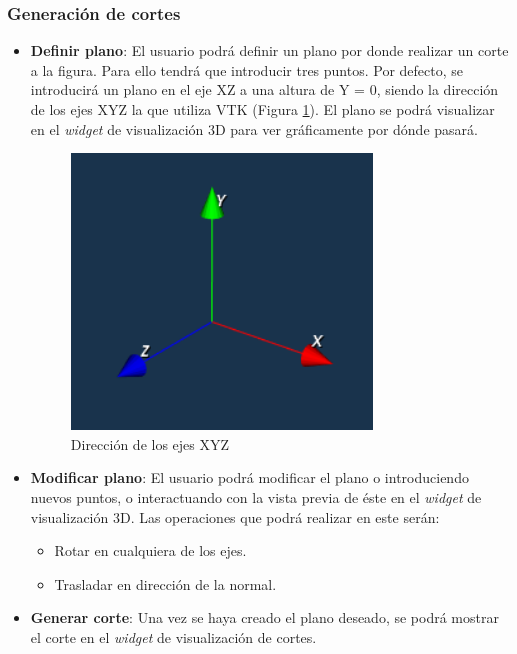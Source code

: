 		\subsubsection{Generación de cortes}
		\begin{itemize}
			\item \textbf{Definir plano}: El usuario podrá definir un plano por donde realizar un corte a la figura. Para ello tendrá que introducir tres puntos. Por defecto, se introducirá un plano en el eje XZ a una altura de Y = 0, siendo la dirección de los ejes XYZ la que utiliza VTK (Figura \ref{fig:vtk_axes}). El plano se podrá visualizar en el \textit{widget} de visualización 3D para ver gráficamente por dónde pasará.
			\begin{figure}[H]
				\centering
				\includegraphics[width=8cm]{imagenes/vtk_axes}
				\caption{Dirección de los ejes XYZ}
				\label{fig:vtk_axes}
			\end{figure}
			\item \textbf{Modificar plano}: El usuario podrá modificar el plano o introduciendo nuevos puntos, o interactuando con la vista previa de éste en el \textit{widget} de visualización 3D. Las operaciones que podrá realizar en este serán:
			\begin{itemize}
				\item Rotar en cualquiera de los ejes.
				\item Trasladar en dirección de la normal.
			\end{itemize}
			\item \textbf{Generar corte}: Una vez se haya creado el plano deseado, se podrá mostrar el corte en el \textit{widget} de visualización de cortes.
		\end{itemize}
	
